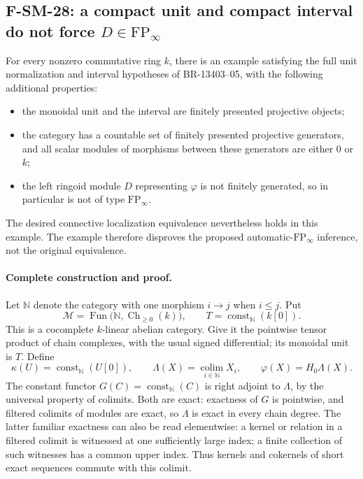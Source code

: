 \documentclass[11pt,a4paper]{article}
\theoremstyle{definition}\newtheorem{definition}[theorem]{Definition}
\theoremstyle{remark}\newtheorem{remark}[theorem]{Remark}
\begin{document}
\subsection{F-SM-28: a compact unit and compact interval do not force \(D\in\mathrm{FP}_\infty\)}
For every nonzero commutative ring \(k\), there is an example satisfying
the full unit normalization and interval hypotheses of BR-13403--05,
with the following additional properties:
\begin{itemize}
\item the monoidal unit and the interval are finitely presented
projective objects;
\item the category has a countable set of finitely presented projective
generators, and all scalar modules of morphisms between these generators
are either \(0\) or \(k\);
\item the left ringoid module \(D\) representing \(\varphi\) is not
finitely generated, so in particular is not of type
\(\mathrm{FP}_\infty\).
\end{itemize}
The desired connective localization equivalence nevertheless holds
in this example.  The example therefore disproves the proposed
automatic-\(\mathrm{FP}_\infty\) inference, not the original
equivalence.

\paragraph{Complete construction and proof.}
Let \(\mathbb N\) denote the category with one morphism \(i\to j\)
when \(i\le j\).  Put
\[
 \mathcal M=\operatorname{Fun}
     \bigl(\mathbb N,\operatorname{Ch}_{\ge0}(k)\bigr),
 \qquad
 T=\operatorname{const}_{\mathbb N}(k[0]).
 \tag{SM28.1}
\]
This is a cocomplete \(k\)-linear abelian category.  Give it the
pointwise tensor product of chain complexes, with the usual signed
differential; its monoidal unit is \(T\).  Define
\[
 \kappa(U)=\operatorname{const}_{\mathbb N}(U[0]),\qquad
 \Lambda(X)=\operatorname*{colim}_{i\in\mathbb N}X_i,\qquad
 \varphi(X)=H_0\Lambda(X).
 \tag{SM28.2}
\]
The constant functor \(G(C)=\operatorname{const}_{\mathbb N}(C)\)
is right adjoint to \(\Lambda\), by the universal property of colimits.
Both are exact: exactness of \(G\) is pointwise, and filtered colimits
of modules are exact, so \(\Lambda\) is exact in every chain degree.
The latter familiar exactness can also be read elementwise: a kernel
or relation in a filtered colimit is witnessed at one sufficiently
large index; a finite collection of such witnesses has a common
upper index.  Thus kernels and cokernels of short exact sequences
commute with this colimit.
\end{document}
